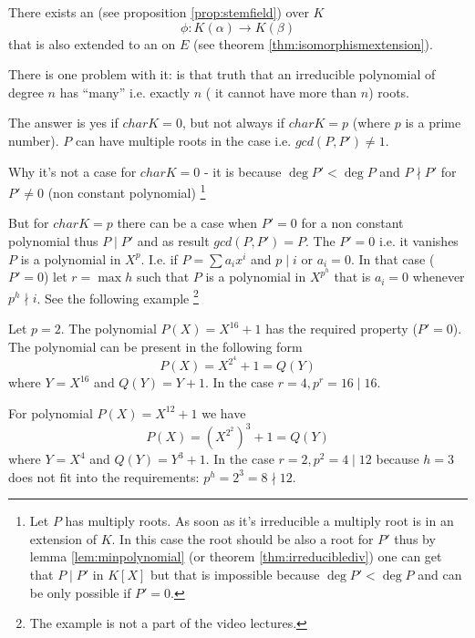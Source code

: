 There exists an  (see proposition
\ref{prop:stemfield}) over $K$
\[
\phi: K\left(\alpha\right) \to K\left(\beta\right)
\]
that is also extended to an  on $E$
(see theorem \ref{thm:isomorphismextension}).

There is one problem with it: is that truth that an irreducible
polynomial of degree $n$ has ``many'' i.e. exactly $n$ ( it cannot
have more than $n$) roots.

The answer is yes if $char K = 0$, but not always if $char K = p$
(where $p$ is a prime number). $P$ can have multiple roots in the case
i.e. $gcd(P, P') \ne 1$.

Why it's not a case for $char K = 0$ - it is because
$\deg P' < \deg P$ and $P \nmid P'$ for $P' \ne 0$ (non constant
polynomial)
\footnote{
  Let $P$ has multiply roots. As soon as it's irreducible a multiply
  root is in an extension of $K$. In this case the root should be also
  a root for $P'$ thus by lemma \ref{lem:minpolynomial} (or
  theorem \ref{thm:irreduciblediv}) one can get
  that $P \mid P'$ in $K\left[X\right]$ but that is impossible because
  $\deg P' < \deg P$ and can be only possible if $P' = 0$.
}

But for $char K = p$ there can be a case when $P' = 0$ for a non
constant polynomial thus $P \mid P'$ and as result $gcd(P, P') = P$.
The $P' = 0$ i.e. it vanishes $P$ is a polynomial in $X^p$. I.e. if
$P = \sum a_i x^i$ and $p \mid i$ or $a_i = 0$. In that case ($P' =
0$) let $r = \max h$ such that $P$ is a polynomial in $X^{p^h}$ that
is $a_i = 0$ whenever $p^h \nmid i$. See the following example
\footnote{
  The example is not a part of the video lectures.
}
\begin{example}
  Let $p = 2$. The polynomial $P\left(X\right) = X^{16} + 1$ has the
  required property ($P' = 0$). The polynomial can be present in the
  following form
  \[
  P\left(X\right) = X^{2^4} + 1 = Q(Y)
  \]
  where $Y = X^{16}$ and $Q(Y) = Y + 1$. In the case
  $r=4, p^r = 16 \mid 16$.

  For polynomial $P\left(X\right) = X^{12} + 1$ we have
  \[
  P\left(X\right) = \left(X^{2^2}\right)^3 + 1 = Q(Y)
  \]
  where $Y = X^4$ and $Q(Y) = Y^3 + 1$. In the case
  $r=2, p^2 = 4 \mid 12$ because $h = 3$ does not fit into
  the requirements: $p^h = 2^3 = 8 \nmid 12$.
\end{example}

